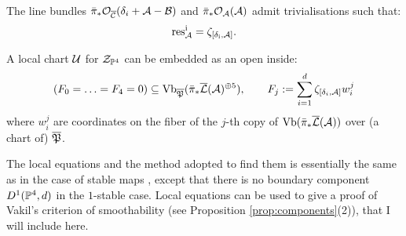 \begin{prop}\cite[Proposition 4.13]{HL}\label{prop:res}
The line bundles $\bar\pi_*\mathcal{O}_{\overline{\mathcal C}}(\mathcal \delta_i+\mathcal A-\mathcal B)$ and $\bar\pi_*\mathcal{O}_{\mathcal A}(\mathcal A) $ admit trivialisations such that:
\[\rm{res}^i_{\mathcal A}=\zeta_{[\delta_i,\mathcal A]}.\]
\end{prop}
\begin{prop}\label{prop:equations} \cite[Theorems 2.17-19]{HL}
A local chart $\mathcal U$ for $\mathcal Z_{\mathbb P^4}$ can be embedded as an open inside:
\[ (F_0=\ldots=F_4=0)\subseteq \operatorname{Vb}_{\overline{\mathfrak{P}}}(\bar{\pi}_*\overline{\mathcal{L}}(\mathcal A)^{\oplus 5}),\qquad F_j:=\sum_{i=1}^d \zeta_{[\delta_i,\mathcal A]}w_i^j \]
where $w_i^j$ are coordinates on the fiber of the $j$-th copy of $\rm{Vb}(\bar{\pi}_*\overline{\mathcal{L}}(\mathcal A))$ over (a chart of) $\overline{\mathfrak{P}}$.
\end{prop}
The local equations and the method adopted to find them is essentially the same as in the case of stable maps \cite{HL}, except that there is no boundary component $D^1(\mathbb P^4,d)$ in the $1$-stable case. Local equations can be used to give a proof of Vakil's criterion of smoothability (see Proposition \ref{prop:components}(2)), that I will include here.
